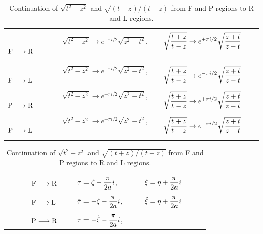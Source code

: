 \documentclass[aps,prd,preprintnumbers,nofootinbib,showpacs]{revtex4}%
\begin{document}
\begin{widetext}
\begin{center}
\begin{table}[t]
\begin{tabular}{lll}
\hline\\
~~~~~~
 ${\rm F} \longrightarrow {\rm R}$ ~~~&
 $\displaystyle{\sqrt{t^2-z^2}\rightarrow e^{-\pi i/2}\sqrt{z^2-t^2}}$, ~~~~&
 $\displaystyle{\sqrt{t+z\over t-z}\rightarrow e^{+\pi i/2} \sqrt{z+t\over z-t}}$
~~~~~~
\\
\\
~~~~~~
 ${\rm F} \longrightarrow {\rm L}$ ~~~&
 $\displaystyle{\sqrt{t^2-z^2}\rightarrow e^{-\pi i/2}\sqrt{z^2-t^2}}$, ~~~~&
 $\displaystyle{\sqrt{t+z\over t-z}\rightarrow e^{-\pi i/2} \sqrt{z+t\over z-t}}$
\\
\\
~~~~~~
 ${\rm P}  \longrightarrow {\rm R}$ ~~~&
 $\displaystyle{\sqrt{t^2-z^2}\rightarrow e^{+\pi i/2}\sqrt{z^2-t^2}}$, ~~~~&
 $\displaystyle{\sqrt{t+z\over t-z}\rightarrow e^{+\pi i/2} \sqrt{z+t\over z-t}}$
\\
\\
~~~~~~
 $ {\rm P}  \longrightarrow {\rm L}$ ~~~&
 $\displaystyle{\sqrt{t^2-z^2}\rightarrow e^{+\pi i/2}\sqrt{z^2-t^2}}$, ~~~~&
 $\displaystyle{\sqrt{t+z\over t-z}\rightarrow e^{-\pi i/2} \sqrt{z+t\over z-t}}$
\\
\\
\hline
\end{tabular}
\caption{Continuation of $\sqrt{t^2-z^2}$ and $\sqrt{(t+z)/(t-z)}$ 
from F and P regions to R and L regions.}
\label{tableone}
\vspace{1cm}
\begin{tabular}{lll}
\hline\\
~~~~~~
 ${\rm F} \longrightarrow {\rm R}$ ~~~&
 $\displaystyle{\tau=\zeta-{\pi \over 2a }i}$, ~~~~&
 $\displaystyle{\xi=\eta+{\pi \over 2a}i}$~~~~~~
\\
\\
~~~~~~
 ${\rm F} \longrightarrow {\rm L}$ ~~~&
 $\displaystyle{\tilde \tau =-\zeta-{\pi \over 2a }i}$,~~~~&
 $\displaystyle{\tilde \xi = \eta+{\pi \over 2a}i}$
\\
\\
~~~~~~
 ${\rm P}  \longrightarrow {\rm R}$ ~~~&
 $\displaystyle{\tau=-\tilde\zeta-{\pi \over 2a }i}$,~~~~&

\end{tabular}
\end{table}
\end{center}
\end{widetext}
\end{document}
